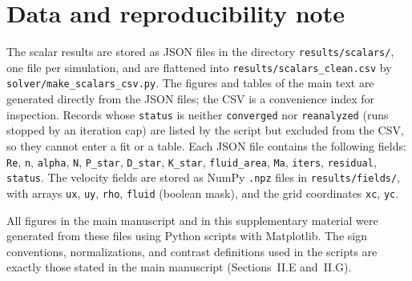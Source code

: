 \section{Data and reproducibility note}
\label{suppsec:repro}

The scalar results are stored as JSON files in the directory \texttt{results/scalars/}, one file per simulation, and are flattened into \texttt{results/scalars\_clean.csv} by \texttt{solver/make\_scalars\_csv.py}. The figures and tables of the main text are generated directly from the JSON files; the CSV is a convenience index for inspection. Records whose \texttt{status} is neither \texttt{converged} nor \texttt{reanalyzed} (runs stopped by an iteration cap) are listed by the script but excluded from the CSV, so they cannot enter a fit or a table. Each JSON file contains the following fields: \texttt{Re}, \texttt{n}, \texttt{alpha}, \texttt{N}, \texttt{P\_star}, \texttt{D\_star}, \texttt{K\_star}, \texttt{fluid\_area}, \texttt{Ma}, \texttt{iters}, \texttt{residual}, \texttt{status}. The velocity fields are stored as NumPy \texttt{.npz} files in \texttt{results/fields/}, with arrays \texttt{ux}, \texttt{uy}, \texttt{rho}, \texttt{fluid} (boolean mask), and the grid coordinates \texttt{xc}, \texttt{yc}.

All figures in the main manuscript and in this supplementary material were generated from these files using Python scripts with Matplotlib. The sign conventions, normalizations, and contrast definitions used in the scripts are exactly those stated in the main manuscript (Sections~II.E and~II.G).

